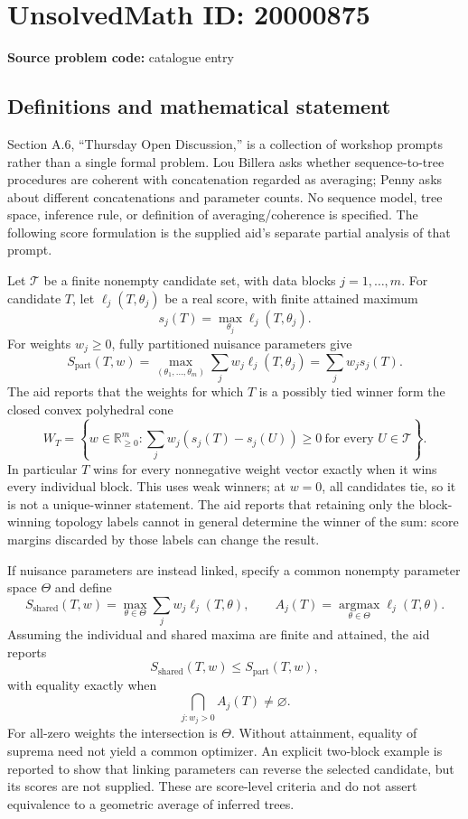 \documentclass[11pt]{article}
\newcommand{\R}{\mathbb{R}}
\begin{document}
\section*{UnsolvedMath ID: 20000875}
\textbf{Source problem code:} catalogue entry
\subsection{Definitions and mathematical statement}
Section A.6, ``Thursday Open Discussion,'' is a collection of workshop prompts rather than a single formal problem. Lou Billera asks whether sequence-to-tree procedures are coherent with concatenation regarded as averaging; Penny asks about different concatenations and parameter counts. No sequence model, tree space, inference rule, or definition of averaging/coherence is specified. The following score formulation is the supplied aid's separate partial analysis of that prompt.

Let \(\mathcal T\) be a finite nonempty candidate set, with data blocks \(j=1,\ldots,m\). For candidate \(T\), let \(\ell_j(T,\theta_j)\) be a real score, with finite attained maximum
\[
 s_j(T)=\max_{\theta_j}\ell_j(T,\theta_j).
\]
For weights \(w_j\ge0\), fully partitioned nuisance parameters give
\[
 S_{\mathrm{part}}(T,w)
 =\max_{(\theta_1,\ldots,\theta_m)}\sum_jw_j\ell_j(T,\theta_j)
 =\sum_jw_js_j(T).
\]
The aid reports that the weights for which \(T\) is a possibly tied winner form the closed convex polyhedral cone
\[
 W_T=\left\{w\in\R_{\ge0}^m:
 \sum_jw_j(s_j(T)-s_j(U))\ge0\ \text{for every }U\in\mathcal T\right\}.
\]
In particular \(T\) wins for every nonnegative weight vector exactly when it wins every individual block. This uses weak winners; at \(w=0\), all candidates tie, so it is not a unique-winner statement. The aid reports that retaining only the block-winning topology labels cannot in general determine the winner of the sum: score margins discarded by those labels can change the result.

If nuisance parameters are instead linked, specify a common nonempty parameter space \(\Theta\) and define
\[
 S_{\mathrm{shared}}(T,w)=\max_{\theta\in\Theta}\sum_jw_j\ell_j(T,\theta),
 \qquad A_j(T)=\operatorname*{argmax}_{\theta\in\Theta}\ell_j(T,\theta).
\]
Assuming the individual and shared maxima are finite and attained, the aid reports
\[
 S_{\mathrm{shared}}(T,w)\le S_{\mathrm{part}}(T,w),
\]
with equality exactly when
\[
 \bigcap_{j:w_j>0}A_j(T)\ne\varnothing.
\]
For all-zero weights the intersection is \(\Theta\). Without attainment, equality of suprema need not yield a common optimizer. An explicit two-block example is reported to show that linking parameters can reverse the selected candidate, but its scores are not supplied. These are score-level criteria and do not assert equivalence to a geometric average of inferred trees.
\end{document}
